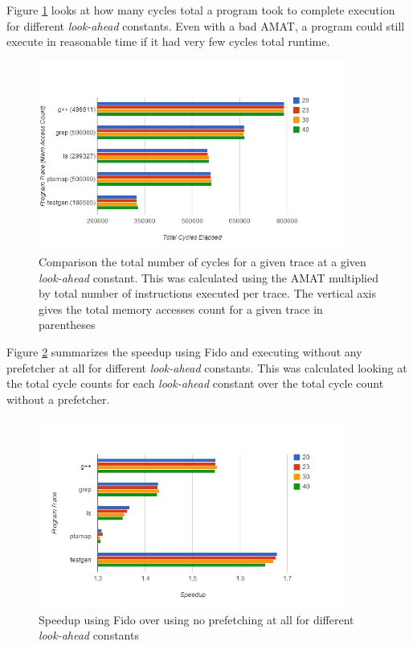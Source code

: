 \documentclass[11pt]{article}
\begin{document}
Figure \ref{TotCyl} looks at how many cycles total a program took to complete execution for different \textit{look-ahead} constants. Even with a bad AMAT, a program could still execute in reasonable time if it had very few cycles total runtime. 
\begin{figure}[H]

\centering
\includegraphics[width=0.9\textwidth]{TotalCycleExecuted.jpg}
\caption{ \label{TotCyl} Comparison the total number of cycles for a given trace at a given \textit{look-ahead} constant. This was calculated using the AMAT multiplied by total number of instructions executed per trace. The vertical axis gives the total memory accesses count for a given trace in parentheses}
\end{figure}



Figure \ref{speedup} summarizes the speedup using Fido and executing without any prefetcher at all for different \textit{look-ahead} constants. This was calculated looking at the total cycle counts for each \textit{look-ahead} constant over the total cycle count without a prefetcher. 
\begin{figure}[H]

\centering
\includegraphics[width=0.9\textwidth]{SpeedupFromNoPrefetcher.jpg}
\caption{ \label{speedup} Speedup using Fido over using no prefetching at all for different \textit{look-ahead} constants}
\end{figure}
\end{document}
